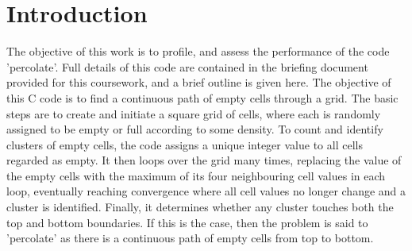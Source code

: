 \documentclass[12pt,a4paper]{article}
\begin{document}











\newpage
{}

\section{Introduction}

The objective of this work is to profile, and assess the performance of the code 'percolate'. Full details of this code are contained in the briefing document provided for this coursework, and a brief outline is given here. 
The objective of this C code is to find a continuous path of empty cells through a grid. The basic steps are to create and initiate a square grid of cells, where each is randomly assigned to be empty or full according to some density. To count and identify clusters of empty cells, the code assigns a unique integer value to all cells regarded as empty. It then loops over the grid many times, replacing the value of the empty cells with the maximum of its four neighbouring cell values in each loop, eventually reaching convergence where all cell values no longer change and a cluster is identified. Finally, it determines whether any cluster touches both the top and bottom boundaries. If this is the case, then the problem is said to 'percolate' as there is a continuous path of empty cells from top to bottom.
\end{document}
